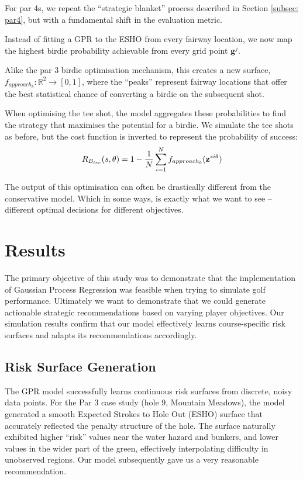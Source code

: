 \documentclass[11pt, letterpaper]{article}
\begin{document}
For par 4s, we repeat the ``strategic blanket'' process described in Section \ref{subsec: par4}, but with a fundamental shift in the evaluation metric.

Instead of fitting a GPR to the ESHO from every fairway location, we now map the highest birdie probability achievable from every grid point $\mathbf{g}^j$.

Alike the par 3 birdie optimisation mechanism, this creates a new surface, $f_{approach_b}: \mathbb{R}^2 \to [0,1]$, where the ``peaks'' represent fairway locations that offer the best statistical chance of converting a birdie on the subsequent shot.

When optimising the tee shot, the model aggregates these probabilities to find the strategy that maximises the potential for a birdie. We simulate the tee shots as before, but the cost function is inverted to represent the probability of success:
$$R_{B_{tee}}(s, \theta) = 1 - \frac{1}{N} \sum^N_{i =1} f_{approach_b}(\mathbf{z}^{si\theta})$$

The output of this optimisation can often be drastically different from the conservative model. Which in some ways, is exactly what we want to see – different optimal decisions for different objectives. 
\section{Results}
\label{sec:Results}
The primary objective of this study was to demonstrate that the implementation of Gaussian Process Regression was feasible when trying to simulate golf performance. Ultimately we want to demonstrate that we could generate actionable strategic recommendations based on varying player objectives. Our simulation results confirm that our model effectively learns course-specific risk surfaces and adapts its recommendations accordingly.

\subsection{Risk Surface Generation}
The GPR model successfully learns continuous risk surfaces from discrete, noisy data points. For the Par 3 case study (hole 9, Mountain Meadows), the model generated a smooth Expected Strokes to Hole Out (ESHO) surface that accurately reflected the penalty structure of the hole. The surface naturally exhibited higher ``risk'' values near the water hazard and bunkers, and lower values in the wider part of the green, effectively interpolating difficulty in unobserved regions. Our model subsequently gave us a very reasonable recommendation.
\end{document}

